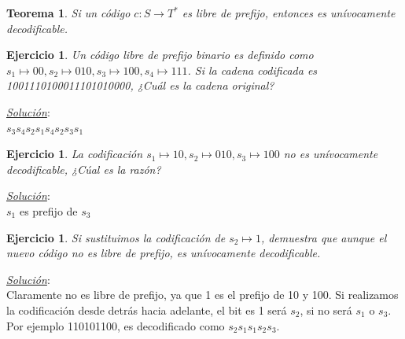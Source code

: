 \documentclass{beamer}
\newtheorem{teorema} [Teorema] {Teorema}
\newtheorem{ejercicio} [Corolario]{Ejercicio}
\begin{document}


\begin{frame}      \small
 
\begin{teorema} \label{th:PFUD}
Si un código  $c: S\rightarrow T^{*}$ es libre de prefijo, entonces es unívocamente decodificable.
\end{teorema}
\end{frame}


\begin{frame}      \small

\begin{ejercicio}
Un código libre de prefijo binario es definido como $s_{1} \mapsto 00,  s_{2} \mapsto  010, s_{3} \mapsto 100,  s_{4} \mapsto  111$. Si la cadena codificada es
1001110100011101010000, ¿Cuál es la cadena original?
\end{ejercicio}

\pause
\textit{\underline{Solución}}:\\ $ s_{3}  s_{4} s_{2} s_{1}  s_{4} s_{2} s_{3} s_{1}$

\pause
\begin{ejercicio}

La codificación $s_{1} \mapsto 10,  s_{2} \mapsto  010, s_{3} \mapsto 100 $ no es unívocamente decodificable, ¿Cúal es la razón?
\end{ejercicio}

\pause
\textit{\underline{Solución}}: \\$s_{1}$ es prefijo de $s_{3}$


\end{frame}



\begin{frame}      \small
 





\begin{ejercicio}
Si sustituimos la codificación de $s_{2}  \mapsto 1$, demuestra que aunque el nuevo código no es libre de prefijo, es unívocamente decodificable.
\end{ejercicio}

\pause

\textit{\underline{Solución}}:\\  Claramente no es libre de prefijo, ya que 1 es el prefijo de 10 y 100. Si realizamos la codificación desde detrás hacia adelante, el bit es 1 será $s_{2}$, si no será $s_{1}$ o $s_{3}$. Por ejemplo 110101100, es decodificado como $s_{2}s_{1}s_{1}s_{2}s_{3}$.

\end{frame}
\end{document}
